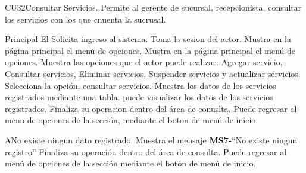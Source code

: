 



	\begin{UseCase}{CU32}{Consultar Servicios.}{
		Permite al gerente de sucursal, recepcionista, consultar los servicios con los que cnuenta la sucrusal.
	}
	\end{UseCase}

	\begin{UCtrayectoria}{Principal}
		\UCpaso[\UCactor] El Solicita ingreso al sistema.
		\UCpaso Toma la sesion del actor.
		\UCpaso Mustra en la página principal el menú de opciones.
		\UCpaso[\UCactor] Mustra en la página principal el menú de opciones.
		\UCpaso Muestra las opciones que el actor puede realizar: Agregar servicio, Consultar servicios, Eliminar servicios, Suspender servicios y actualizar servicios.
		\UCpaso[\UCactor] Selecciona la opción, consultar servicios.
		\UCpaso Muestra los datos de los servicios registrados mediante una tabla.
		\UCpaso[\UCactor] puede visualizar los datos de los servicios registrados.
		\UCpaso[\UCactor] Finaliza su operacion dentro del área de conuslta.
		\UCpaso[\UCactor] Puede regresar al menu de opciones de la sección, mediante el boton de menú de inicio.
	\end{UCtrayectoria}

\begin{UCtrayectoriaA}{A}{No existe ningun dato registrado.}
			\UCpaso[\UCactor] Muestra el mensaje {\bf MS7-}``No existe ningun registro''
			\UCpaso[\UCactor] Finaliza su operación dentro del área de consulta. 
			\UCpaso[\UCactor] Puede regresar al menú de opciones de la sección  mediante el botón de menú de inicio.
		\end{UCtrayectoriaA}
	
